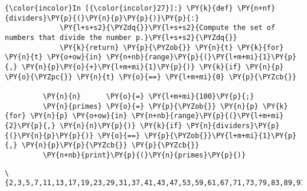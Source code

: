 \begin{Verbatim}[commandchars=\\\{\}]
{\color{incolor}In [{\color{incolor}27}]:} \PY{k}{def} \PY{n+nf}{dividers}\PY{p}{(}\PY{n}{p}\PY{p}{)}\PY{p}{:}
             \PY{l+s+s2}{\PYZdq{}}\PY{l+s+s2}{Compute the set of numbers that divide the number p.}\PY{l+s+s2}{\PYZdq{}}
             \PY{k}{return} \PY{p}{\PYZob{}} \PY{n}{t} \PY{k}{for} \PY{n}{t} \PY{o+ow}{in} \PY{n+nb}{range}\PY{p}{(}\PY{l+m+mi}{1}\PY{p}{,} \PY{n}{p}\PY{o}{+}\PY{l+m+mi}{1}\PY{p}{)} \PY{k}{if} \PY{n}{p} \PY{o}{\PYZpc{}} \PY{n}{t} \PY{o}{==} \PY{l+m+mi}{0} \PY{p}{\PYZcb{}}
         
         \PY{n}{n}      \PY{o}{=} \PY{l+m+mi}{100}\PY{p}{;}
         \PY{n}{primes} \PY{o}{=} \PY{p}{\PYZob{}} \PY{n}{p} \PY{k}{for} \PY{n}{p} \PY{o+ow}{in} \PY{n+nb}{range}\PY{p}{(}\PY{l+m+mi}{2}\PY{p}{,} \PY{n}{n}\PY{p}{)} \PY{k}{if} \PY{n}{dividers}\PY{p}{(}\PY{n}{p}\PY{p}{)} \PY{o}{==} \PY{p}{\PYZob{}}\PY{l+m+mi}{1}\PY{p}{,} \PY{n}{p}\PY{p}{\PYZcb{}} \PY{p}{\PYZcb{}}
         \PY{n+nb}{print}\PY{p}{(}\PY{n}{primes}\PY{p}{)}
\end{Verbatim}

\begin{Verbatim}[commandchars=\\\{\}]
\{2,3,5,7,11,13,17,19,23,29,31,37,41,43,47,53,59,61,67,71,73,79,83,89,97\}
\end{Verbatim}

